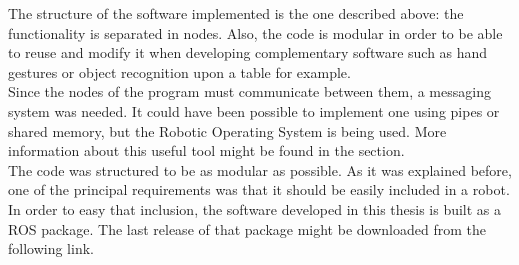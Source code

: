 The structure of the software implemented is the one described above: the functionality is separated in nodes. Also, the code is modular in order to be able to reuse and modify it when developing complementary software such as hand gestures or object recognition upon a table for example. 
\\

Since the nodes of the program must communicate between them, a messaging system was needed. It could have been possible to implement one using pipes or shared memory, but the Robotic Operating System\cite{ros} is being used. More information about this useful tool might be found in the section. 
\\

The code was structured to be as modular as possible. As it was explained before, one of the principal requirements was that it should be easily included in a robot. In order to easy that inclusion, the software developed in this thesis is built as a ROS package. 
The last release of that package might be downloaded from the following link. 


